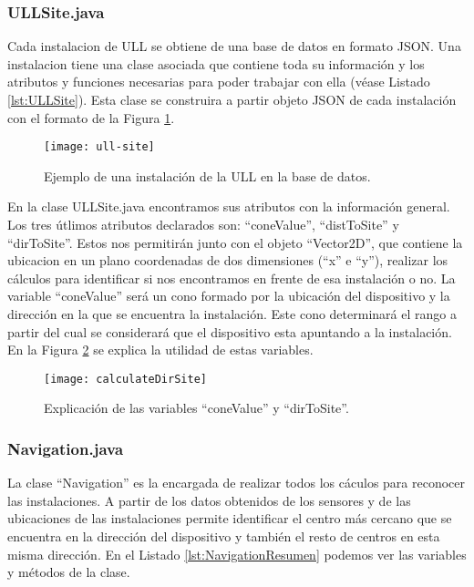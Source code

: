 \subsubsection{ULLSite.java}

Cada instalacion de ULL se obtiene de una base de datos en formato JSON. Una instalacion tiene una clase asociada que contiene toda su información y los atributos y funciones necesarias para poder trabajar con ella (véase Listado \ref{lst:ULLSite}). Esta clase se construira a partir objeto JSON de cada instalación con el formato de la Figura  \ref{fig:ull-site}.




\begin{figure}[h] 
    \centering
    \texttt{[image: ull-site]}
    \caption{Ejemplo de una instalación de la ULL en la base de datos.}
    \label{fig:ull-site}
\end{figure}


En la clase ULLSite.java encontramos sus atributos con la información general. Los tres útlimos atributos declarados son: ``coneValue'', ``distToSite'' y ``dirToSite''. Estos nos permitirán junto con el objeto ``Vector2D'', que contiene la ubicacion en un plano coordenadas de dos dimensiones (``x'' e ``y''), realizar los cálculos para identificar si nos encontramos en frente de esa instalación o no. La variable ``coneValue'' será un cono formado por la ubicación del dispositivo y la dirección en la que se encuentra la instalación. Este cono determinará el rango a partir del cual se considerará que el dispositivo esta apuntando a la instalación. En la Figura \ref{fig:dirSite} se explica la utilidad de estas variables.

\begin{figure}[h] 
    \centering
    \texttt{[image: calculateDirSite]}
    \caption{Explicación de las variables ``coneValue'' y ``dirToSite''.}
    \label{fig:dirSite}
\end{figure}

  
\subsubsection{Navigation.java}

La clase ``Navigation'' es la encargada de realizar todos los cáculos para reconocer las instalaciones. A partir de los datos obtenidos de los sensores y de las ubicaciones de las instalaciones permite identificar el centro más cercano que se encuentra en la dirección del dispositivo y también el resto de centros en esta misma dirección. En el Listado \ref{lst:NavigationResumen} podemos ver las variables y métodos de la clase.

